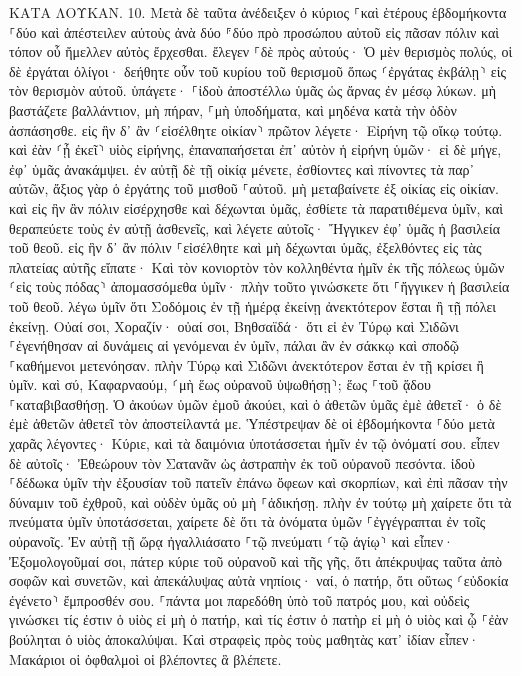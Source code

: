 \documentclass[twoside, 9pt]{extreport}
\begin{document}
ΚΑΤΑ ΛΟΥΚΑΝ.
10.
Μετὰ δὲ ταῦτα ἀνέδειξεν ὁ κύριος ⸀καὶ ἑτέρους ἑβδομήκοντα ⸀δύο καὶ ἀπέστειλεν αὐτοὺς ἀνὰ δύο ⸁δύο πρὸ προσώπου αὐτοῦ εἰς πᾶσαν πόλιν καὶ τόπον οὗ ἤμελλεν αὐτὸς ἔρχεσθαι. 
ἔλεγεν ⸀δὲ πρὸς αὐτούς· Ὁ μὲν θερισμὸς πολύς, οἱ δὲ ἐργάται ὀλίγοι· δεήθητε οὖν τοῦ κυρίου τοῦ θερισμοῦ ὅπως ⸂ἐργάτας ἐκβάλῃ⸃ εἰς τὸν θερισμὸν αὐτοῦ. 
ὑπάγετε· ⸀ἰδοὺ ἀποστέλλω ὑμᾶς ὡς ἄρνας ἐν μέσῳ λύκων. 
μὴ βαστάζετε βαλλάντιον, μὴ πήραν, ⸀μὴ ὑποδήματα, καὶ μηδένα κατὰ τὴν ὁδὸν ἀσπάσησθε. 
εἰς ἣν δ᾽ ἂν ⸂εἰσέλθητε οἰκίαν⸃ πρῶτον λέγετε· Εἰρήνη τῷ οἴκῳ τούτῳ. 
καὶ ἐὰν ⸂ᾖ ἐκεῖ⸃ υἱὸς εἰρήνης, ἐπαναπαήσεται ἐπ᾽ αὐτὸν ἡ εἰρήνη ὑμῶν· εἰ δὲ μήγε, ἐφ᾽ ὑμᾶς ἀνακάμψει. 
ἐν αὐτῇ δὲ τῇ οἰκίᾳ μένετε, ἐσθίοντες καὶ πίνοντες τὰ παρ᾽ αὐτῶν, ἄξιος γὰρ ὁ ἐργάτης τοῦ μισθοῦ ⸀αὐτοῦ. μὴ μεταβαίνετε ἐξ οἰκίας εἰς οἰκίαν. 
καὶ εἰς ἣν ἂν πόλιν εἰσέρχησθε καὶ δέχωνται ὑμᾶς, ἐσθίετε τὰ παρατιθέμενα ὑμῖν, 
καὶ θεραπεύετε τοὺς ἐν αὐτῇ ἀσθενεῖς, καὶ λέγετε αὐτοῖς· Ἤγγικεν ἐφ᾽ ὑμᾶς ἡ βασιλεία τοῦ θεοῦ. 
εἰς ἣν δ᾽ ἂν πόλιν ⸀εἰσέλθητε καὶ μὴ δέχωνται ὑμᾶς, ἐξελθόντες εἰς τὰς πλατείας αὐτῆς εἴπατε· 
Καὶ τὸν κονιορτὸν τὸν κολληθέντα ἡμῖν ἐκ τῆς πόλεως ὑμῶν ⸂εἰς τοὺς πόδας⸃ ἀπομασσόμεθα ὑμῖν· πλὴν τοῦτο γινώσκετε ὅτι ⸀ἤγγικεν ἡ βασιλεία τοῦ θεοῦ. 
λέγω ὑμῖν ὅτι Σοδόμοις ἐν τῇ ἡμέρᾳ ἐκείνῃ ἀνεκτότερον ἔσται ἢ τῇ πόλει ἐκείνῃ. 
Οὐαί σοι, Χοραζίν· οὐαί σοι, Βηθσαϊδά· ὅτι εἰ ἐν Τύρῳ καὶ Σιδῶνι ⸀ἐγενήθησαν αἱ δυνάμεις αἱ γενόμεναι ἐν ὑμῖν, πάλαι ἂν ἐν σάκκῳ καὶ σποδῷ ⸀καθήμενοι μετενόησαν. 
πλὴν Τύρῳ καὶ Σιδῶνι ἀνεκτότερον ἔσται ἐν τῇ κρίσει ἢ ὑμῖν. 
καὶ σύ, Καφαρναούμ, ⸂μὴ ἕως οὐρανοῦ ὑψωθήσῃ⸃; ἕως ⸀τοῦ ᾅδου ⸀καταβιβασθήσῃ. 
Ὁ ἀκούων ὑμῶν ἐμοῦ ἀκούει, καὶ ὁ ἀθετῶν ὑμᾶς ἐμὲ ἀθετεῖ· ὁ δὲ ἐμὲ ἀθετῶν ἀθετεῖ τὸν ἀποστείλαντά με. 
Ὑπέστρεψαν δὲ οἱ ἑβδομήκοντα ⸀δύο μετὰ χαρᾶς λέγοντες· Κύριε, καὶ τὰ δαιμόνια ὑποτάσσεται ἡμῖν ἐν τῷ ὀνόματί σου. 
εἶπεν δὲ αὐτοῖς· Ἐθεώρουν τὸν Σατανᾶν ὡς ἀστραπὴν ἐκ τοῦ οὐρανοῦ πεσόντα. 
ἰδοὺ ⸀δέδωκα ὑμῖν τὴν ἐξουσίαν τοῦ πατεῖν ἐπάνω ὄφεων καὶ σκορπίων, καὶ ἐπὶ πᾶσαν τὴν δύναμιν τοῦ ἐχθροῦ, καὶ οὐδὲν ὑμᾶς οὐ μὴ ⸀ἀδικήσῃ. 
πλὴν ἐν τούτῳ μὴ χαίρετε ὅτι τὰ πνεύματα ὑμῖν ὑποτάσσεται, χαίρετε δὲ ὅτι τὰ ὀνόματα ὑμῶν ⸀ἐγγέγραπται ἐν τοῖς οὐρανοῖς. 
Ἐν αὐτῇ τῇ ὥρᾳ ἠγαλλιάσατο ⸀τῷ πνεύματι ⸂τῷ ἁγίῳ⸃ καὶ εἶπεν· Ἐξομολογοῦμαί σοι, πάτερ κύριε τοῦ οὐρανοῦ καὶ τῆς γῆς, ὅτι ἀπέκρυψας ταῦτα ἀπὸ σοφῶν καὶ συνετῶν, καὶ ἀπεκάλυψας αὐτὰ νηπίοις· ναί, ὁ πατήρ, ὅτι οὕτως ⸂εὐδοκία ἐγένετο⸃ ἔμπροσθέν σου. 
⸀πάντα μοι παρεδόθη ὑπὸ τοῦ πατρός μου, καὶ οὐδεὶς γινώσκει τίς ἐστιν ὁ υἱὸς εἰ μὴ ὁ πατήρ, καὶ τίς ἐστιν ὁ πατὴρ εἰ μὴ ὁ υἱὸς καὶ ᾧ ⸀ἐὰν βούληται ὁ υἱὸς ἀποκαλύψαι. 
Καὶ στραφεὶς πρὸς τοὺς μαθητὰς κατ᾽ ἰδίαν εἶπεν· Μακάριοι οἱ ὀφθαλμοὶ οἱ βλέποντες ἃ βλέπετε. 
\end{document}
